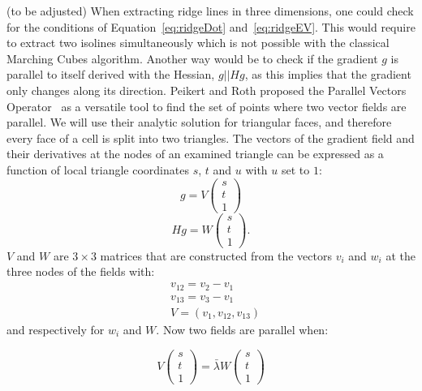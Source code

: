 (to be adjusted)
When extracting ridge lines in three dimensions, one could check for the
conditions of Equation~\ref{eq:ridgeDot} and~\ref{eq:ridgeEV}. This
would require to extract two isolines simultaneously which is not
possible with the classical Marching Cubes algorithm. Another way would
be to check if the gradient $g$ is parallel to itself derived with the
Hessian, $g || H g$, as this implies that the gradient only changes
along its direction. Peikert and Roth proposed the Parallel Vectors
Operator~\cite{PV} as a versatile tool to find the set of points where
two vector fields are parallel. We will use their analytic solution for
triangular faces, and therefore every face of a cell is split into two
triangles. The vectors of the gradient field and their derivatives at
the nodes of an examined triangle can be expressed as a function of
local triangle coordinates $s$, $t$ and $u$ with $u$ set to $1$:
\begin{equation}
  g = V
  \begin{pmatrix}
    s\\
    t\\
    1
  \end{pmatrix}
\end{equation}
\begin{equation}
  H g = W
  \begin{pmatrix}
    s\\
    t\\
    1
  \end{pmatrix}.
\end{equation}
\noindent $V$ and $W$ are $3 \times 3$ matrices that are constructed
from the vectors $v_i$ and $w_i$ at the three nodes of the fields with:
\begin{align}
  &v_{12} = v_2 - v_1\\
  &v_{13} = v_3 - v_1\\
  &V = (v_1, v_{12}, v_{13})
\end{align}
\noindent and respectively for $w_i$ and $W$. Now two fields are
parallel when:

\begin{equation}
  V
  \begin{pmatrix}
    s\\
    t\\
    1
  \end{pmatrix}
  = \bar{\lambda} W
  \begin{pmatrix}
    s\\
    t\\
    1
  \end{pmatrix}
\end{equation}


